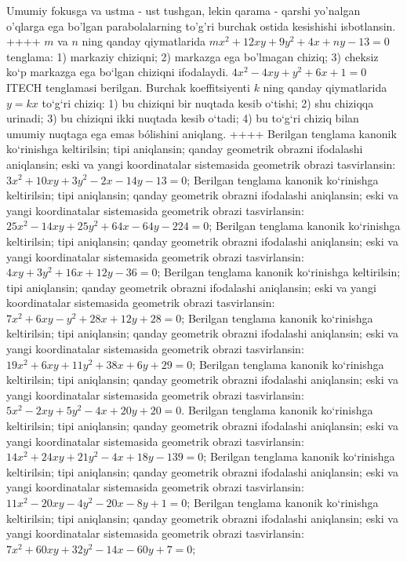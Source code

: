 Umumiy fokusga va ustma - ust tushgan, lekin qarama - qarshi yo'nalgan o'qlarga ega bo'lgan parabolalarning to'g'ri burchak ostida kesishishi isbotlansin.
++++
$m$ va $n$ ning qanday qiymatlarida $m x^2+12 x y+9 y^2+4 x+n y-13=0$ tenglama: 1) markaziy chiziqni; 2) markazga ega bo'lmagan chiziq; 3) cheksiz ko‘p markazga ega bo‘lgan chiziqni ifodalaydi.
$4 x^2-4 x y+y^2+6 x+1=0$ ITECH tenglamasi berilgan. Burchak koeffitsiyenti $k$ ning qanday qiymatlarida $y=kx$ to‘g‘ri chiziq: 1) bu chiziqni bir nuqtada kesib o‘tishi; 2) shu chiziqqa urinadi; 3) bu chiziqni ikki nuqtada kesib o‘tadi; 4) bu to‘g‘ri chiziq bilan umumiy nuqtaga ega emas bólishini aniqlang.
++++
Berilgan tenglama kanonik ko‘rinishga keltirilsin; tipi aniqlansin; qanday geometrik obrazni ifodalashi aniqlansin; eski va yangi koordinatalar sistemasida geometrik obrazi tasvirlansin: $3 x^2+10 x y+3 y^2-2 x-14 y-13=0$;
Berilgan tenglama kanonik ko‘rinishga keltirilsin; tipi aniqlansin; qanday geometrik obrazni ifodalashi aniqlansin; eski va yangi koordinatalar sistemasida geometrik obrazi tasvirlansin: $25 x^2-14 x y+25 y^2+64 x-64 y-224=0$;
Berilgan tenglama kanonik ko‘rinishga keltirilsin; tipi aniqlansin; qanday geometrik obrazni ifodalashi aniqlansin; eski va yangi koordinatalar sistemasida geometrik obrazi tasvirlansin: $4 x y+3 y^2+16 x+12 y-36=0$;
Berilgan tenglama kanonik ko‘rinishga keltirilsin; tipi aniqlansin; qanday geometrik obrazni ifodalashi aniqlansin; eski va yangi koordinatalar sistemasida geometrik obrazi tasvirlansin: $7 x^2+6 x y-y^2+28 x+12 y+28=0$;
Berilgan tenglama kanonik ko‘rinishga keltirilsin; tipi aniqlansin; qanday geometrik obrazni ifodalashi aniqlansin; eski va yangi koordinatalar sistemasida geometrik obrazi tasvirlansin: $19 x^2+6 x y+11 y^2+38 x+6 y+29=0$;
Berilgan tenglama kanonik ko‘rinishga keltirilsin; tipi aniqlansin; qanday geometrik obrazni ifodalashi aniqlansin; eski va yangi koordinatalar sistemasida geometrik obrazi tasvirlansin: $5 x^2-2 x y+5 y^2-4 x+20 y+20=0$.
Berilgan tenglama kanonik ko‘rinishga keltirilsin; tipi aniqlansin; qanday geometrik obrazni ifodalashi aniqlansin; eski va yangi koordinatalar sistemasida geometrik obrazi tasvirlansin: $14 x^2+24 x y+21 y^2-4 x+18 y-139=0$;
Berilgan tenglama kanonik ko‘rinishga keltirilsin; tipi aniqlansin; qanday geometrik obrazni ifodalashi aniqlansin; eski va yangi koordinatalar sistemasida geometrik obrazi tasvirlansin: $11 x^2-20 x y-4 y^2-20 x-8 y+1=0$;
Berilgan tenglama kanonik ko‘rinishga keltirilsin; tipi aniqlansin; qanday geometrik obrazni ifodalashi aniqlansin; eski va yangi koordinatalar sistemasida geometrik obrazi tasvirlansin: $7 x^2+60 x y+32 y^2-14 x-60 y+7=0$;
